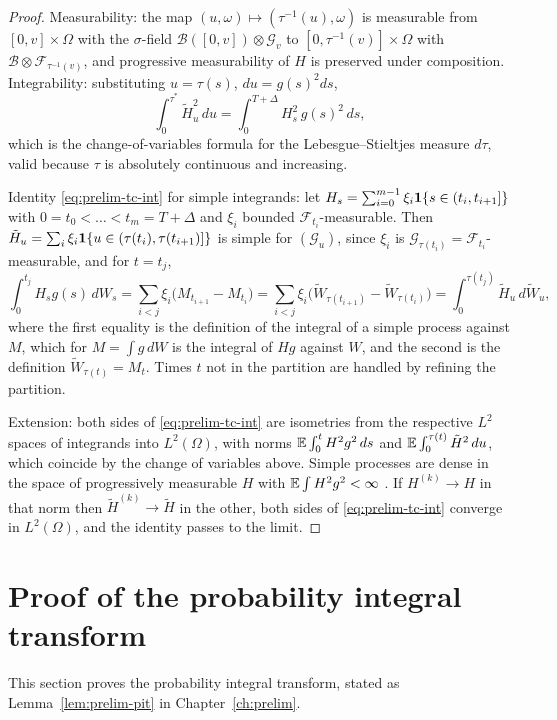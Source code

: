 \documentclass[../../main.tex]{subfiles}
\begin{document}
\begin{proof}
Measurability: the map $(u,\omega)\mapsto(\tau^{-1}(u),\omega)$ is measurable from $[0,v]\times\Omega$ with the $\sigma$-field $\mathcal B([0,v])\otimes\mathcal G_v$ to $[0,\tau^{-1}(v)]\times\Omega$ with $\mathcal B\otimes\mathcal F_{\tau^{-1}(v)}$, and progressive measurability of $H$ is preserved under composition. Integrability: substituting $u=\tau(s)$, $du=g(s)^2ds$,
\[
\int_0^{\tau^*}\tilde H_u^2\,du=\int_0^{T+\Delta}H_s^2\,g(s)^2\,ds ,
\]
which is the change-of-variables formula for the Lebesgue--Stieltjes measure $d\tau$, valid because $\tau$ is absolutely continuous and increasing.

Identity \eqref{eq:prelim-tc-int} for simple integrands: let $H_s=\sum_{i=0}^{m-1}\xi_i\mathbf{1}\{s\in(t_i,t_{i+1}]\}$ with $0=t_0<\dots<t_m=T+\Delta$ and $\xi_i$ bounded $\mathcal F_{t_i}$-measurable. Then $\tilde H_u=\sum_i\xi_i\mathbf{1}\{u\in(\tau(t_i),\tau(t_{i+1})]\}$ is simple for $(\mathcal G_u)$, since $\xi_i$ is $\mathcal G_{\tau(t_i)}=\mathcal F_{t_i}$-measurable, and for $t=t_j$,
\[
\int_0^{t_j}H_sg(s)\,dW_s=\sum_{i<j}\xi_i\big(M_{t_{i+1}}-M_{t_i}\big)=\sum_{i<j}\xi_i\big(\tilde W_{\tau(t_{i+1})}-\tilde W_{\tau(t_i)}\big)=\int_0^{\tau(t_j)}\tilde H_u\,d\tilde W_u ,
\]
where the first equality is the definition of the integral of a simple process against $M$, which for $M=\int g\,dW$ is the integral of $Hg$ against $W$, and the second is the definition $\tilde W_{\tau(t)}=M_t$. Times $t$ not in the partition are handled by refining the partition.

Extension: both sides of \eqref{eq:prelim-tc-int} are isometries from the respective $L^2$ spaces of integrands into $L^2(\Omega)$, with norms $\mathbb{E}\int_0^tH^2g^2\,ds$ and $\mathbb{E}\int_0^{\tau(t)}\tilde H^2\,du$, which coincide by the change of variables above. Simple processes are dense in the space of progressively measurable $H$ with $\mathbb{E}\int H^2g^2<\infty$ \cite[Prop.~3.2.6]{karatzas1991}. If $H^{(k)}\to H$ in that norm then $\tilde H^{(k)}\to\tilde H$ in the other, both sides of \eqref{eq:prelim-tc-int} converge in $L^2(\Omega)$, and the identity passes to the limit.
\end{proof}

\section{Proof of the probability integral transform}\label{appB:pit}

This section proves the probability integral transform, stated as Lemma~\ref{lem:prelim-pit} in Chapter~\ref{ch:prelim}.
\end{document}
